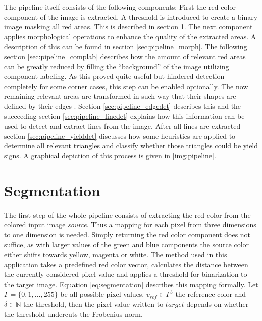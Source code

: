 \documentclass{report}
\begin{document}
The pipeline itself consists of the following components: First the
red color component of the image is extracted. A threshold is
introduced to create a binary image masking all red areas. This is
described in section \ref{sec:pipeline_binarization}. The next
component applies morphological operations to enhance the quality of
the extracted areas. A description of this can be found in section
\ref{sec:pipeline_morph}. The following section
\ref{sec:pipeline_complab} describes how the amount of relevant red
areas can be greatly reduced by filling the ``background'' of the
image utilizing component labeling. As this proved quite useful but
hindered detection completely for some corner cases, this step can be
enabled optionally. The now remaining relevant areas are transformed
in such way that their shapes are defined by their edges
{\color{red}{(either dilation + xor or sobel)}}. Section
\ref{sec:pipeline_edgedet} describes this and the succeeding section
\ref{sec:pipeline_linedet} explains how this information can be used
to detect and extract lines from the image. After all lines are
extracted section \ref{sec:pipeline_yielddet} discusses how some
heuristics are applied to determine all relevant triangles and
classify whether those triangles could be yield signs. A graphical
depiction of this process is given in \ref{img:pipeline}.

{\color{red}{To do: Apply a median filter before or after
    segmentation?}}


\section{Segmentation}
\label{sec:pipeline_binarization}

The first step of the whole pipeline consists of extracting the red
color from the colored input image \textit{source}. Thus a mapping for
each pixel from three dimensions to one dimension is needed. Simply
returning the red color component does not suffice, as with larger
values of the green and blue components the source color either shifts
towards yellow, magenta or white. The method used in this application
takes a predefined red color vector, calculates the distance between
the currently considered pixel value and applies a threshold for
binarization to the target image. Equation \ref{eq:segmentation}
describes this mapping formally. Let \( \Gamma = \{0, 1, ..., 255\} \)
be all possible pixel values, \( v_{ref} \in \Gamma^3 \) the reference
color and \( \delta \in \mathbb{N} \) the threshold, then the pixel
value written to \( target \) depends on whether the threshold
undercuts the Frobenius norm.
\end{document}
